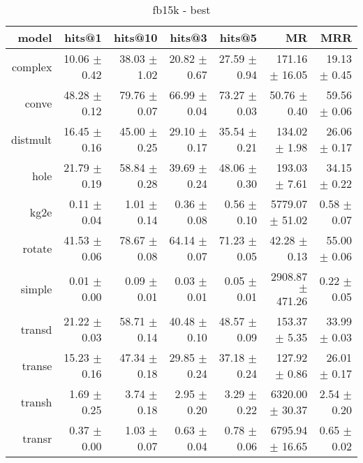 \documentclass{article}
\begin{document}
    
    \begin{table}
\centering
\caption{fb15k - best}
\begin{tabular}{rrrrrrr}
\toprule
    model &        hits@1 &       hits@10 &        hits@3 &        hits@5 &                MR &           MRR \\
\midrule
  complex &  10.06 $\pm$ 0.42 &  38.03 $\pm$ 1.02 &  20.82 $\pm$ 0.67 &  27.59 $\pm$ 0.94 &    171.16 $\pm$ 16.05 &  19.13 $\pm$ 0.45 \\
    conve &  48.28 $\pm$ 0.12 &  79.76 $\pm$ 0.07 &  66.99 $\pm$ 0.04 &  73.27 $\pm$ 0.03 &      50.76 $\pm$ 0.40 &  59.56 $\pm$ 0.06 \\
 distmult &  16.45 $\pm$ 0.16 &  45.00 $\pm$ 0.25 &  29.10 $\pm$ 0.17 &  35.54 $\pm$ 0.21 &     134.02 $\pm$ 1.98 &  26.06 $\pm$ 0.17 \\
     hole &  21.79 $\pm$ 0.19 &  58.84 $\pm$ 0.28 &  39.69 $\pm$ 0.24 &  48.06 $\pm$ 0.30 &     193.03 $\pm$ 7.61 &  34.15 $\pm$ 0.22 \\
     kg2e &   0.11 $\pm$ 0.04 &   1.01 $\pm$ 0.14 &   0.36 $\pm$ 0.08 &   0.56 $\pm$ 0.10 &   5779.07 $\pm$ 51.02 &   0.58 $\pm$ 0.07 \\
   rotate &  41.53 $\pm$ 0.06 &  78.67 $\pm$ 0.08 &  64.14 $\pm$ 0.07 &  71.23 $\pm$ 0.05 &      42.28 $\pm$ 0.13 &  55.00 $\pm$ 0.06 \\
   simple &   0.01 $\pm$ 0.00 &   0.09 $\pm$ 0.01 &   0.03 $\pm$ 0.01 &   0.05 $\pm$ 0.01 &  2908.87 $\pm$ 471.26 &   0.22 $\pm$ 0.05 \\
   transd &  21.22 $\pm$ 0.03 &  58.71 $\pm$ 0.14 &  40.48 $\pm$ 0.10 &  48.57 $\pm$ 0.09 &     153.37 $\pm$ 5.35 &  33.99 $\pm$ 0.03 \\
   transe &  15.23 $\pm$ 0.16 &  47.34 $\pm$ 0.18 &  29.85 $\pm$ 0.24 &  37.18 $\pm$ 0.24 &     127.92 $\pm$ 0.86 &  26.01 $\pm$ 0.17 \\
   transh &   1.69 $\pm$ 0.25 &   3.74 $\pm$ 0.18 &   2.95 $\pm$ 0.20 &   3.29 $\pm$ 0.22 &   6320.00 $\pm$ 30.37 &   2.54 $\pm$ 0.20 \\
   transr &   0.37 $\pm$ 0.00 &   1.03 $\pm$ 0.07 &   0.63 $\pm$ 0.04 &   0.78 $\pm$ 0.06 &   6795.94 $\pm$ 16.65 &   0.65 $\pm$ 0.02 \\
\bottomrule
\end{tabular}
\end{table}
\end{document}
